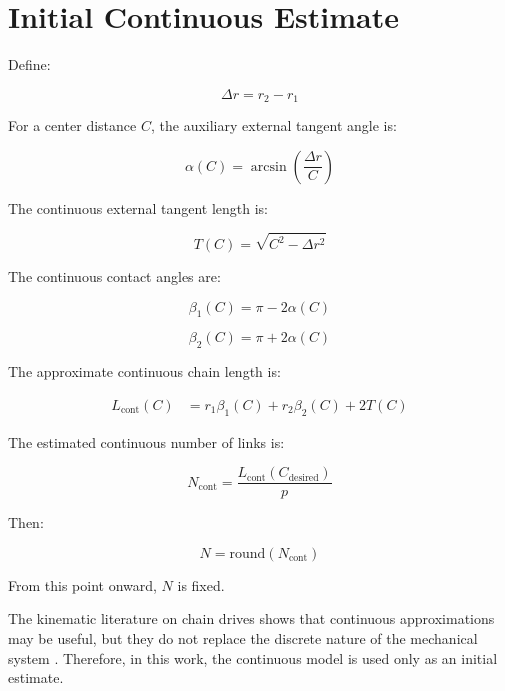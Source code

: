 \documentclass[12pt,a4paper]{article}
\begin{document}
\section{Initial Continuous Estimate}

Define:

\begin{equation}
\Delta r = r_2-r_1
\end{equation}

For a center distance $C$, the auxiliary external tangent angle is:

\begin{equation}
\alpha(C)=\arcsin\left(\frac{\Delta r}{C}\right)
\end{equation}

The continuous external tangent length is:

\begin{equation}
T(C)=\sqrt{C^2-\Delta r^2}
\end{equation}

The continuous contact angles are:

\begin{equation}
\beta_1(C)=\pi-2\alpha(C)
\end{equation}

\begin{equation}
\beta_2(C)=\pi+2\alpha(C)
\end{equation}

The approximate continuous chain length is:

\begin{equation}
\begin{aligned}
L_{\text{cont}}(C)
&=
r_1\beta_1(C)
+
r_2\beta_2(C)
+
2T(C)
\end{aligned}
\end{equation}

The estimated continuous number of links is:

\begin{equation}
N_{\text{cont}}=
\frac{L_{\text{cont}}(C_{\text{desired}})}{p}
\end{equation}

Then:

\begin{equation}
N=\mathrm{round}(N_{\text{cont}})
\end{equation}

From this point onward, $N$ is fixed.

The kinematic literature on chain drives shows that continuous approximations may be useful, but they do not replace the discrete nature of the mechanical system \cite{fuglede2016mmt,fuglede2016jsv}. Therefore, in this work, the continuous model is used only as an initial estimate.
\end{document}
